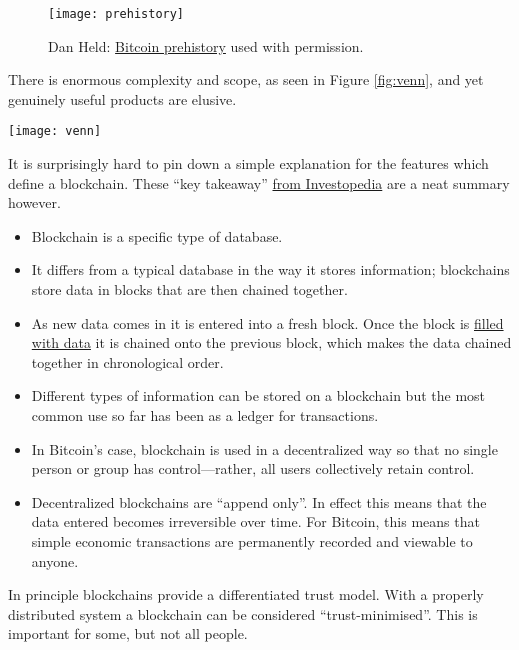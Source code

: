 \begin{figure}
  \centering
    \texttt{[image: prehistory]}
  \caption{Dan Held: \href{https://www.danheld.com/blog/2019/1/6/planting-bitcoinsoil-34}{Bitcoin prehistory} used with permission.}
  \label{fig:prehistory}
\end{figure}

There is enormous complexity and scope, as seen in Figure \ref{fig:venn}, and yet genuinely useful products are elusive.
\begin{figure*}[ht]\centering %
	\texttt{[image: venn]}
	\caption{\href{https://unchained.com/blog/blockchain-spectrum/}{Intersecting disciplines}. Reused with permission \href{https://unchained.com/}{Dhruv Bansal}}
	\label{fig:venn}
\end{figure*}
It is surprisingly hard to pin down a simple explanation for the features which define a blockchain. These ``key takeaway'' \href{https://www.investopedia.com/terms/b/blockchain.asp}{from Investopedia} are a neat summary however.\par
\begin{itemize} \item Blockchain is a specific type of database. \item It differs from a typical database in the way it stores information; blockchains store data in blocks that are then chained together. \item As new data comes in it is entered into a fresh block. Once the block is \href{https://bits.monospace.live/}{filled with data} it is chained onto the previous block, which makes the data chained together in chronological order. \item Different types of information can be stored on a blockchain but the most common use so far has been as a ledger for transactions. \item In Bitcoin’s case, blockchain is used in a decentralized way so that no single person or group has control—rather, all users collectively retain control. \item Decentralized blockchains are ``append only''. In effect this means that the data entered becomes irreversible over time. For Bitcoin, this means that simple economic transactions are permanently recorded and viewable to anyone. \end{itemize}
In principle blockchains provide a differentiated trust model. With a properly distributed system a blockchain can be considered ``trust-minimised''. This is important for some, but not all people. \par
